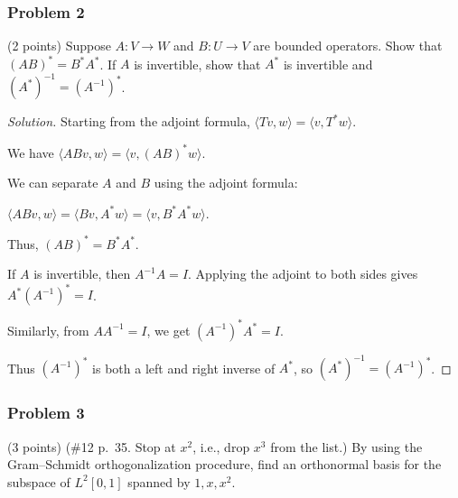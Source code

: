 \documentclass[11pt]{article}
\newcommand{\1}{\mathbf{1}}
\theoremstyle{definition}
\newenvironment{solution}{\begin{proof}[Solution]}{\end{proof}}
\begin{document}
\subsubsection*{Problem 2}
(2 points) Suppose $A:V\to W$ and $B:U\to V$ are bounded operators. Show that $(AB)^*=B^*A^*$. If $A$ is invertible, show that $A^*$ is invertible and $(A^*)^{-1}=(A^{-1})^*$.

\begin{solution}
Starting from the adjoint formula, $\langle Tv,w\rangle=\langle v,T^*w\rangle$.

We have $\langle ABv,w\rangle=\langle v,(AB)^*w\rangle$.

\par We can separate $A$ and $B$ using the adjoint formula:

$\langle ABv,w\rangle=\langle Bv,A^*w\rangle=\langle v,B^*A^*w\rangle$.

Thus, $(AB)^*=B^*A^*$.

\par If $A$ is invertible, then $A^{-1}A=I$. Applying the adjoint to both sides gives $A^*(A^{-1})^*=I$.

Similarly, from $AA^{-1}=I$, we get $(A^{-1})^*A^*=I$.

Thus $(A^{-1})^*$ is both a left and right inverse of $A^*$, so $(A^*)^{-1}=(A^{-1})^*$.
\end{solution}

\subsubsection*{Problem 3}
(3 points) (\#12 p.~35. Stop at $x^2$, i.e., drop $x^3$ from the list.) By using the Gram--Schmidt orthogonalization procedure, find an orthonormal basis for the subspace of $L^2[0,1]$ spanned by $1,x,x^2$.
\end{document}
